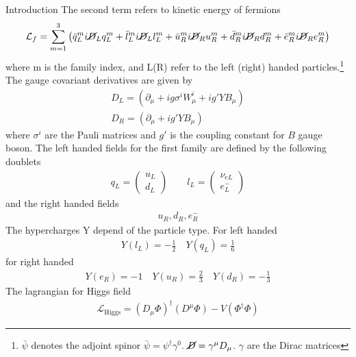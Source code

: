 \begin{chapter}{Introduction}
The second term refers to kinetic energy of fermions 
\begin{align}
\mathcal{L}_f=\sum_{m=1}^{3} \left(\bar{q}^m_{L}i \cancel{D}_L q^m_{L}+ 
\bar{l}^m_{L}i \cancel{D}_L l^m_{L} +\bar{u}_{R}^m i \cancel{D}_R u_{R}^m
+\bar{d}_{R}^m i \cancel{D}_R d_{R}^m+\bar{e}_{R}^m i \cancel{D}_R e_{R}^m \right)
\end{align}
where m is the family index, and L(R)
refer to the left (right) handed particles.\footnote{$\bar{\psi}$ denotes the adjoint spinor $\bar{\psi}=\psi^\dagger \gamma^0$.
$\cancel{D}=\gamma^\mu D_\mu$. $\gamma$ are the Dirac matrices}
The gauge covariant derivatives are given by
\begin{align}
{D}_L =\left(\partial_\mu+ig\sigma^iW^i_\mu +ig'Y B_\mu\right)\\
{D}_R =\left(\partial_\mu +ig' Y B_\mu\right)
\end{align}
where $\sigma^i$ are the Pauli matrices and $g'$ is the coupling constant for $B$ gauge boson. %
The left handed fields for the first family are defined by the following doublets
\begin{align}
  q_L=\left(\begin{array}{c}
 u_L \\
d_L
\end{array} \right) \qquad  l_L=\left(\begin{array}{c}
 \nu_{eL} \\
e^-_L
\end{array} \right)
\end{align}
and the right handed fields
\begin{align}
  u_R, d_R, e^-_R 
\end{align}
The hypercharges Y depend of the particle type. For left handed 
\begin{align}
  Y(l_L)=-\frac{1}{2} \quad Y(q_L)=\frac{1}{6} 
 \end{align}
 for right handed 
 \begin{align}
Y(e_R)=-1 \quad Y(u_R)=\frac{2}{3} \quad Y(d_R)=-\frac{1}{3}
\end{align}
The lagrangian for Higgs field
\begin{align}
\mathcal{L}_{\text{Higgs}}=(D_\mu \Phi)^\dagger (D^\mu \Phi)-V(\Phi^\dagger \Phi)

\end{align}
\end{chapter}
